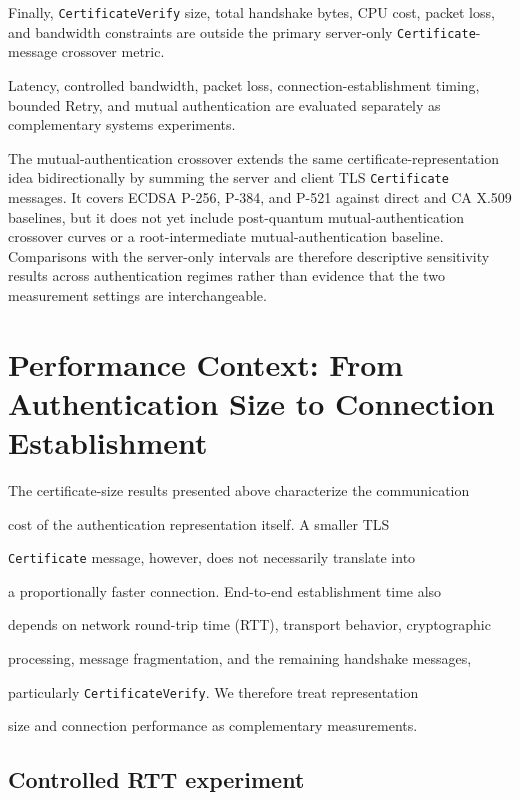 \documentclass[journal]{IEEEtran}
\begin{document}
Finally, \texttt{CertificateVerify} size, total handshake bytes, CPU cost, packet loss, and bandwidth constraints are outside the primary server-only \texttt{Certificate}-message crossover metric.

Latency, controlled bandwidth, packet loss, connection-establishment timing, bounded Retry, and mutual authentication are evaluated separately as complementary systems experiments.

The mutual-authentication crossover extends the same certificate-representation idea bidirectionally by summing the server and client TLS \texttt{Certificate} messages. It covers ECDSA P-256, P-384, and P-521 against direct and CA X.509 baselines, but it does not yet include post-quantum mutual-authentication crossover curves or a root-intermediate mutual-authentication baseline. Comparisons with the server-only intervals are therefore descriptive sensitivity results across authentication regimes rather than evidence that the two measurement settings are interchangeable.



\section{Performance Context: From Authentication Size to Connection Establishment}

\label{sec:performance}



The certificate-size results presented above characterize the communication

cost of the authentication representation itself. A smaller TLS

\texttt{Certificate} message, however, does not necessarily translate into

a proportionally faster connection. End-to-end establishment time also

depends on network round-trip time (RTT), transport behavior, cryptographic

processing, message fragmentation, and the remaining handshake messages,

particularly \texttt{CertificateVerify}. We therefore treat representation

size and connection performance as complementary measurements.



\subsection{Controlled RTT experiment}
\end{document}
